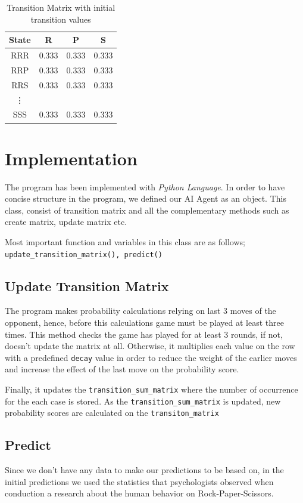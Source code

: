 \documentclass{IEEEtran}
\begin{document}
	\begin{table}[h!]
		\begin{center}
					\caption{Transition Matrix with initial transition values}
			\begin{tabular}{c | c  c  c}
				State &  R & P & S \\
				\hline
				RRR & 0.333 & 0.333 & 0.333 \\
				RRP & 0.333 & 0.333 & 0.333 \\
				RRS & 0.333 & 0.333 & 0.333 \\
				\vdots \\
				SSS & 0.333 & 0.333 & 0.333 \\
			\end{tabular}
		\end{center}
	\end{table}
	
	\section{Implementation}
	
	The program has been implemented with \textit{Python Language}. In order to have concise structure in the program, we defined our AI Agent as an object. This class, consist of transition matrix and all the complementary methods such as create matrix, update matrix etc.
	
	Most important function and variables in this class are as follows; \texttt{update\_transition\_matrix(), predict()}
	
	\subsection{Update Transition Matrix}
		The program makes probability calculations relying on last 3 moves of the opponent, hence, before this calculations game must be played at least three times. This method checks the game has played for at least 3 rounds, if not, doesn't update the matrix at all. Otherwise, it multiplies each value on the row with a predefined \texttt{decay} value in order to reduce the weight of the earlier moves and increase the effect of the last move on the probability score.
		
		Finally, it updates the \texttt{transition\_sum\_matrix} where the number of occurrence for the each case is stored. As the \texttt{transition\_sum\_matrix} is updated, new probability scores are calculated on the \texttt{transiton\_matrix}
		
	\subsection{Predict}
		Since we don't have any data to make our predictions to be based on, in the initial predictions we used the statistics that psychologists observed when conduction a research about the human behavior on Rock-Paper-Scissors.  
		
\end{document}
